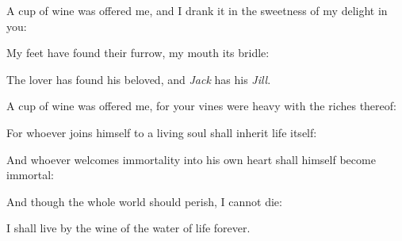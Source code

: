 \begin{justify}
\par A cup of wine was offered me, and I drank it in the sweetness of my delight in you:
\par My feet have found their furrow, my mouth its bridle:
\par The lover has found his beloved, and \emph{Jack} has his \emph{Jill}.
\par A cup of wine was offered me, for your vines were heavy with the riches thereof:
\par For whoever joins himself to a living soul shall inherit life itself:
\par And whoever welcomes immortality into his own heart shall himself become immortal:
\par And though the whole world should perish, I cannot die:
\par I shall live by the wine of the water of life forever.
\end{justify}
